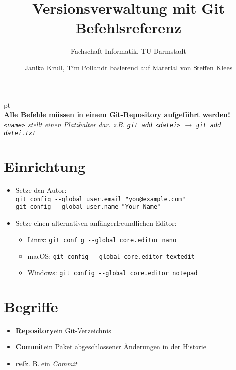 \documentclass[accentcolor=tud8b,colorbacktitle,12pt]{tudexercise}
\author{Janika Krull, Tim Pollandt basierend auf Material von Steffen Klees}
\begin{document}
\title{Versionsverwaltung mit Git\\Befehlsreferenz}
\subtitle{Fachschaft Informatik, TU Darmstadt}
\maketitle

 pt\\
\textbf{Alle Befehle müssen in einem Git-Repository aufgeführt werden!}\\
\textit{\lstinline|<name>| stellt einen Platzhalter dar. z.B. \lstinline|git add <datei>| $\rightarrow$ \lstinline|git add datei.txt|}
\section*{Einrichtung}
\begin{itemize}
	\item Setze den Autor:\\
	\lstinline|git config --global user.email "you@example.com"|\\
	\lstinline|git config --global user.name "Your Name"|

	\item Setze einen alternativen anfängerfreundlichen Editor:
	\begin{itemize}
		\item Linux: \tab\lstinline|git config --global core.editor nano|
		\item macOS: \tab\lstinline|git config --global core.editor textedit|
		\item Windows: \tab\lstinline|git config --global core.editor notepad|
	\end{itemize}
\end{itemize}

\section*{Begriffe}
\begin{itemize}
	\item \textbf{Repository}\tab ein Git-Verzeichnis
	\item \textbf{Commit}\tab ein Paket abgeschlossener Änderungen in der Historie
	\item \textbf{ref}\tab z. B. ein \textit{Commit}
\end{itemize}
\end{document}
